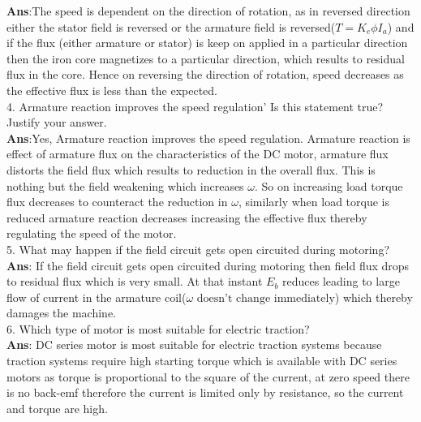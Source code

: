 \documentclass[12pt]{article}
\begin{document}
    \textbf{Ans}:The speed is dependent on the direction of rotation, as in reversed direction either the stator field is reversed or the armature field is reversed($T = K_e\phi I_a$) and if the flux (either armature or stator) is keep on applied in a particular direction then the iron core magnetizes to a particular direction, which results to residual flux in the core. Hence on reversing the direction of rotation, speed decreases as the effective flux is less than the expected.    
    \vspace{0.2cm}\\
    4. Armature reaction improves the speed regulation' Is this statement true? Justify your answer.\vspace{0.1cm} \\
    \textbf{Ans}:Yes, Armature reaction improves the speed regulation. Armature reaction is effect of armature flux on the characteristics of the DC motor, armature flux distorts the field flux which results to reduction in the overall flux. This is nothing but the field weakening which increases $\omega$. So on increasing load torque flux decreases to counteract the reduction in $\omega$, similarly when load torque is reduced armature reaction decreases increasing the effective flux thereby regulating the speed of the motor.   
    \vspace{0.2cm}\\
    5. What may happen if the field circuit gets open circuited during motoring?\vspace{0.1cm} \\
    \textbf{Ans}: If the field circuit gets open circuited during motoring then field flux drops to residual flux which is very small. At that instant $E_b$ reduces leading to large flow of current in the armature coil($\omega \text{ doesn't change immediately}$) which thereby damages the machine.
    \vspace{0.2cm}\\
    6. Which type of motor is most suitable for electric traction?\vspace{0.1cm} \\
    \textbf{Ans}: DC series motor is most suitable for electric traction systems because traction systems require high starting torque which is available with DC series motors as torque is proportional to the square of the current, at zero speed there is no back-emf therefore the current is limited only by resistance, so the current and torque are high.
    \vspace{0.2cm}\\
\end{document}
